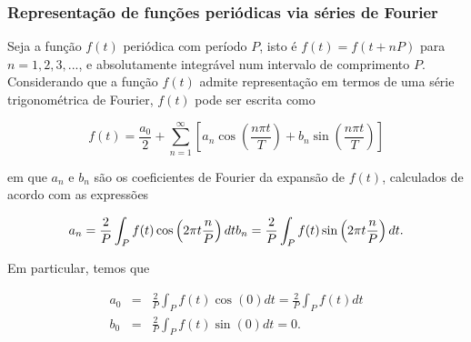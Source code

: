 \documentclass[11pt]{article}
\begin{document}
    \hypertarget{representauxe7uxe3o-de-funuxe7uxf5es-periuxf3dicas-via-suxe9ries-de-fourier}{%
\subsubsection{Representação de funções periódicas via séries de
Fourier}\label{representauxe7uxe3o-de-funuxe7uxf5es-periuxf3dicas-via-suxe9ries-de-fourier}}

Seja a função \(f(t)\) periódica com período \(P\), isto é
\(f(t)=f(t+nP)\) para \(n=1,2,3,...\), e absolutamente integrável num
intervalo de comprimento \(P\). Considerando que a função \(f(t)\)
admite representação em termos de uma série trigonométrica de Fourier,
\(f(t)\) pode ser escrita como

\[ f(t)=\frac{a_{0}}{2}+\sum_{n=1}^{\infty}\left[a_{n} \cos \left(\frac{n \pi t}{T}\right)+b_{n} \sin \left(\frac{n \pi t}{T}\right)\right] \]

em que \(a_n\) e \(b_n\) são os coeficientes de Fourier da expansão de
\(f(t)\), calculados de acordo com as expressões

\[ a_{n}=\frac{2}{P} \int_{P} f(t) \cos \left(2\pi t\frac{n}{P}\right) dt \\
b_{n}=\frac{2}{P} \int_{P} f(t) \sin \left(2\pi t\frac{n}{P}\right) dt.\\ \]

Em particular, temos que 

\begin{eqnarray}
a_{0}&=&\frac{2}{P} \int_{P} f(t) \cos(0) dt =\frac{2}{P} \int_{P} f(t) dt\\
b_{0}&=&\frac{2}{P} \int_{P} f(t) \sin(0) dt = 0.
\end{eqnarray}
\end{document}
